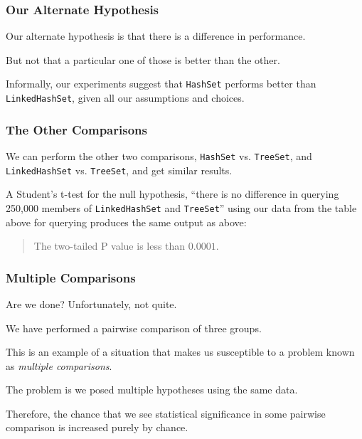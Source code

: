 \begin{frame}
\frametitle{Our Alternate Hypothesis}
\begin{changemargin}{1cm}

Our alternate hypothesis is that there
is a difference in performance. 

But not that a particular one
of those is better than the other. 

Informally, our experiments suggest that
\texttt{HashSet} performs better than \texttt{LinkedHashSet}, given all our
assumptions and choices.

\end{changemargin}
\end{frame}


\begin{frame}
\frametitle{The Other Comparisons}
\begin{changemargin}{1cm}

We can perform the other two comparisons,
\texttt{HashSet} vs. \texttt{TreeSet}, and \texttt{LinkedHashSet}
 vs. \texttt{TreeSet}, and get
similar results.

A Student's t-test for the
null hypothesis, ``there is no difference in querying 250,000
members of \texttt{LinkedHashSet} and \texttt{TreeSet}'' using our data from
the table above for querying produces the same output as above:
\begin{quote}
    The two-tailed P value is less than $0.0001$.
\end{quote}

\end{changemargin}
\end{frame}


\begin{frame}
\frametitle{Multiple Comparisons}
\begin{changemargin}{1cm}

Are we done? Unfortunately, not quite. 

We have performed a pairwise comparison of three groups. 

This is an example of a situation that makes
us susceptible to a problem known as \emph{multiple comparisons}.

The problem is we posed multiple hypotheses using the same
data.

Therefore, the chance that we see statistical significance
in some pairwise comparison is increased purely by chance.

\end{changemargin}
\end{frame}



